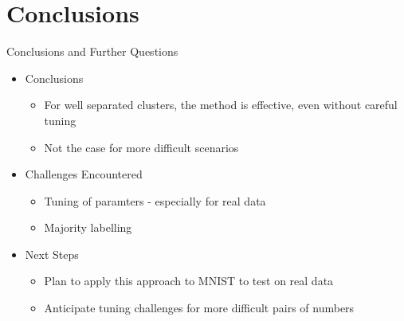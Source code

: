 \section{Conclusions}

\begin{frame}{Conclusions and Further Questions}
    \begin{itemize}

        \item Conclusions
        \begin{itemize}
            \item For well separated clusters, the method is effective, even without careful tuning

            \item Not the case for more difficult scenarios
        \end{itemize}

        \item Challenges Encountered
        \begin{itemize}
            \item Tuning of paramters - especially for real data
            \item Majority labelling
        \end{itemize}

        \item Next Steps

        \begin{itemize}
            \item Plan to apply this approach to MNIST to test on real data

            \item Anticipate tuning challenges for more difficult pairs of numbers
        \end{itemize}
        
    \end{itemize}
\end{frame}